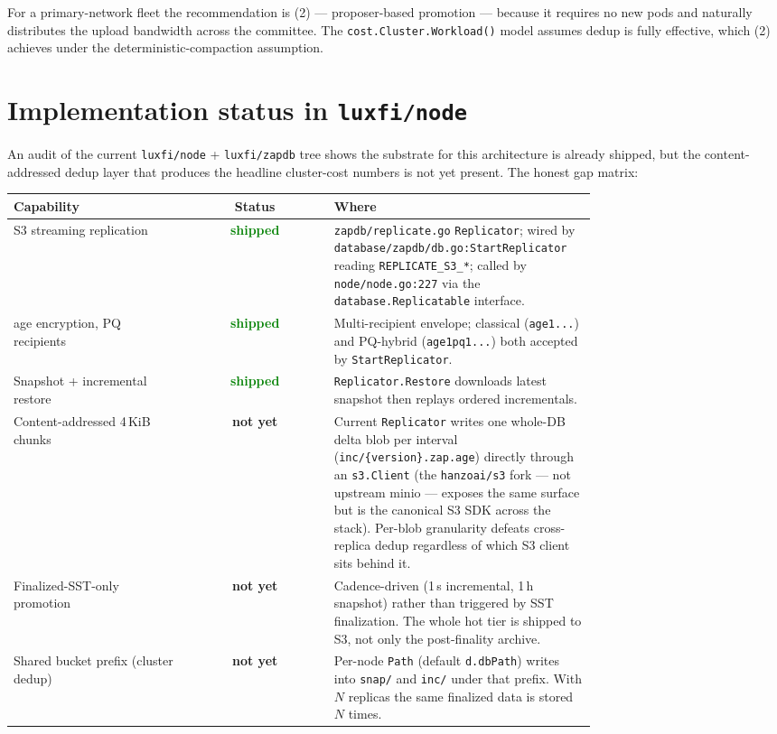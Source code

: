 \documentclass[11pt,a4paper]{article}
\newcommand{\warn}[1]{\textcolor{amber}{\textbf{#1}}}
\newcommand{\ok}[1]{\textcolor{green}{\textbf{#1}}}
\begin{document}
For a primary-network fleet the recommendation is (2) --- proposer-based
promotion --- because it requires no new pods and naturally distributes
the upload bandwidth across the committee. The
\texttt{cost.Cluster.Workload()} model assumes dedup is fully
effective, which (2) achieves under the deterministic-compaction
assumption.

\section*{Implementation status in \texttt{luxfi/node}}

An audit of the current \texttt{luxfi/node} + \texttt{luxfi/zapdb} tree
shows the substrate for this architecture is already shipped, but the
content-addressed dedup layer that produces the headline cluster-cost
numbers is not yet present. The honest gap matrix:

\begin{center}\small
\begin{tabular}{p{0.30\linewidth}cp{0.45\linewidth}}
\toprule
\textbf{Capability} & \textbf{Status} & \textbf{Where} \\
\midrule
S3 streaming replication & \ok{shipped} &
  \texttt{zapdb/replicate.go} \texttt{Replicator}; wired by
  \texttt{database/zapdb/db.go:StartReplicator} reading
  \texttt{REPLICATE\_S3\_*}; called by \texttt{node/node.go:227} via
  the \texttt{database.Replicatable} interface. \\
age encryption, PQ recipients & \ok{shipped} &
  Multi-recipient envelope; classical (\texttt{age1...}) and
  PQ-hybrid (\texttt{age1pq1...}) both accepted by
  \texttt{StartReplicator}. \\
Snapshot + incremental restore & \ok{shipped} &
  \texttt{Replicator.Restore} downloads latest snapshot then replays
  ordered incrementals. \\
Content-addressed 4\,KiB chunks & \warn{not yet} &
  Current \texttt{Replicator} writes one whole-DB delta blob per
  interval (\texttt{inc/\{version\}.zap.age}) directly through an
  \texttt{s3.Client} (the \texttt{hanzoai/s3} fork --- not upstream
  minio --- exposes the same surface but is the canonical S3 SDK
  across the stack). Per-blob granularity defeats cross-replica
  dedup regardless of which S3 client sits behind it. \\
Finalized-SST-only promotion & \warn{not yet} &
  Cadence-driven (1\,s incremental, 1\,h snapshot) rather than
  triggered by SST finalization. The whole hot tier is shipped to
  S3, not only the post-finality archive. \\
Shared bucket prefix (cluster dedup) & \warn{not yet} &
  Per-node \texttt{Path} (default \texttt{d.dbPath}) writes into
  \texttt{snap/} and \texttt{inc/} under that prefix. With $N$
  replicas the same finalized data is stored $N$ times. \\
\bottomrule
\end{tabular}
\end{center}
\end{document}
